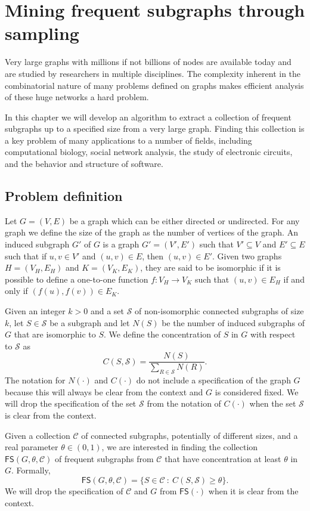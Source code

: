\chapter{Mining frequent subgraphs through sampling}\label{ch:graphmine}

Very large graphs with millions if not billions of nodes are available today and
are studied by researchers in multiple disciplines.
The complexity inherent in the combinatorial nature of many problems defined on
graphs makes efficient analysis of these huge networks a hard problem. 

In this chapter we will develop an algorithm to extract a collection of frequent
subgraphs up to a specified size from a very large graph. Finding this
collection is a key problem of many applications to a number of fields, including
computational biology, social network analysis, the study of electronic
circuits, and the behavior and structure of software.

\section{Problem definition}\label{sec:graphminesettings}
Let $G=(V,E)$ be a graph which can be either directed or
undirected. For any graph we define the size of the graph as the number of
vertices of the graph. An induced subgraph $G'$ of $G$  is a graph $G'=(V',E')$
such that $V'\subseteq V$ and $E'\subseteq E$ such that if $u,v\in V'$ and
$(u,v)\in E$, then $(u,v)\in E'$. Given two graphs $H=(V_H,E_H)$ and
$K=(V_K,E_K)$, they are said to be isomorphic if it is possible to define a
one-to-one function $f:V_H\rightarrow V_K$ such that $(u,v)\in E_H$ if and only
if $(f(u),f(v))\in E_K$.

Given an integer $k>0$ and a set $\mathcal{S}$ of
non-isomorphic connected subgraphs of size $k$, let $S\in\mathcal{S}$ be a
subgraph and let $N(S)$ be the number of induced subgraphs of $G$ that are
isomorphic to $S$. We define the concentration of $S$ in $G$ with respect to
$\mathcal{S}$ as
\[
C(S,\mathcal{S})=\frac{N(S)}{\sum_{R\in\mathcal{S}}N(R)}.\]
The notation for $N(\cdot)$ and $C(\cdot)$ do not include a specification of the
graph $G$ because this will always be clear from the context and $G$ is
considered fixed. We will drop the specification of the set $\mathcal{S}$ from
the notation of $C(\cdot)$ when the set $\mathcal{S}$ is clear from the context.

Given a collection $\mathcal{C}$ of connected subgraphs, potentially of
different sizes, and a real parameter $\theta\in(0,1)$, we are interested in
finding the collection $\mathsf{FS}(G,\theta,\mathcal{C})$ of frequent subgraphs from
$\mathcal{C}$ that have concentration at least $\theta$ in $G$. Formally,
\[
\mathsf{FS}(G,\theta,\mathcal{C})=\{S\in\mathcal{C} ~:~ C(S,\mathcal{S})\ge\theta\}.\]
We will drop the specification of $\mathcal{C}$ and $G$ from $\mathsf{FS}(\cdot)$ when
it is clear from the context.

